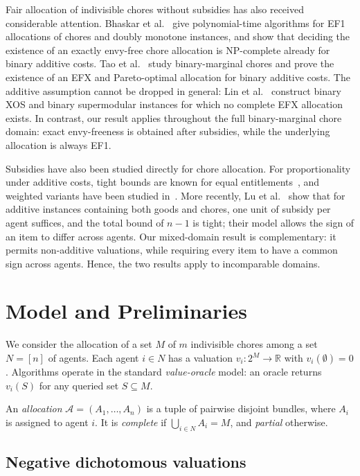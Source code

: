 \documentclass[sigconf,anonymous]{aamas}
\newcommand{\agents}{N}
\newcommand{\items}{M}
\newcommand{\alloc}{\mathcal{A}}
\newcommand{\bundle}[1]{A_{#1}}
\newcommand{\R}{\mathbb{R}}
\theoremstyle{acmplain}
\theoremstyle{acmdefinition}
\theoremstyle{acmplain}
\begin{document}
Fair allocation of indivisible chores without subsidies has also received considerable attention. Bhaskar et al.~\cite{BSV21} give polynomial-time algorithms for EF1 allocations of chores and doubly monotone instances, and show that deciding the existence of an exactly envy-free chore allocation is NP-complete already for binary additive costs. Tao et al.~\cite{tao2025existence} study binary-marginal chores and prove the existence of an EFX and Pareto-optimal allocation for binary additive costs. The additive assumption cannot be dropped in general: Lin et al.~\cite{LLTZ26} construct binary XOS and binary supermodular instances for which no complete EFX allocation exists. In contrast, our result applies throughout the full binary-marginal chore domain: exact envy-freeness is obtained after subsidies, while the underlying allocation is always EF1.

Subsidies have also been studied directly for chore allocation. For proportionality under additive costs, tight bounds are known for equal entitlements~\cite{wu2025revisiting}, and weighted variants have been studied in~\cite{wu2024tree,GSW25}.  More recently, Lu et al.~\cite{LMS26} show that for additive instances containing both goods and chores, one unit of subsidy per agent suffices, and the total bound of $n-1$ is tight; their model allows the sign of an item to differ across agents. Our mixed-domain result is complementary: it permits non-additive valuations, while requiring every item to have a common sign across agents. Hence, the two results apply to incomparable domains.



\section{Model and Preliminaries}
\label{sec:prelim}

We consider the allocation of a set $\items$ of $m$ indivisible chores
among a set $\agents=[n]$ of agents. Each agent $i\in\agents$ has a
valuation $v_i:2^{\items}\to\R$ with $v_i(\emptyset)=0$. Algorithms
operate in the standard \emph{value-oracle} model: an oracle returns
$v_i(S)$ for any queried set $S\subseteq\items$.

An \emph{allocation}
$\alloc=(\bundle{1},\ldots,\bundle{n})$ is a tuple of pairwise
disjoint bundles, where $\bundle{i}$ is assigned to agent $i$.
It is \emph{complete} if
$\bigcup_{i\in\agents}\bundle{i}=\items$, and \emph{partial}
otherwise.

\subsection{Negative dichotomous valuations}
\end{document}

